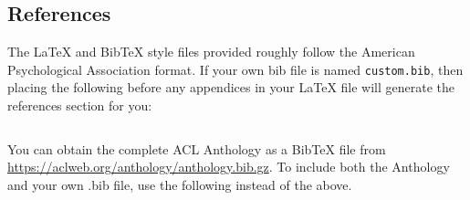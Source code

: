 \documentclass[11pt]{article}
\begin{document}


\subsection{References}

\nocite{Ando2005,andrew2007scalable,rasooli-tetrault-2015}

The \LaTeX{} and Bib\TeX{} style files provided roughly follow the American Psychological Association format.
If your own bib file is named \texttt{custom.bib}, then placing the following before any appendices in your \LaTeX{} file will generate the references section for you:
\begin{quote}
\begin{verbatim}

\end{verbatim}
\end{quote}

You can obtain the complete ACL Anthology as a Bib\TeX{} file from \url{https://aclweb.org/anthology/anthology.bib.gz}.
To include both the Anthology and your own .bib file, use the following instead of the above.
\begin{quote}
\begin{verbatim}

\end{verbatim}
\end{quote}



\end{document}
